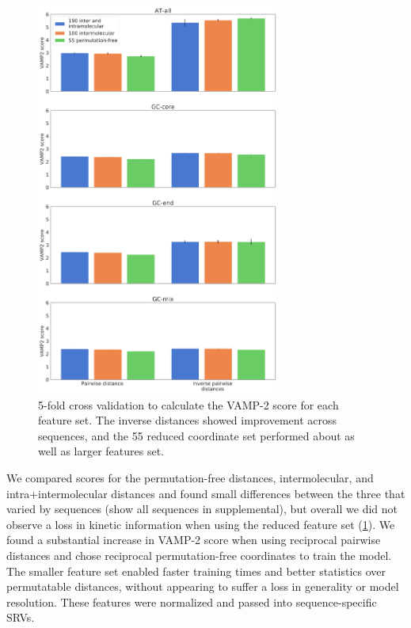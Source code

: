 \documentclass[journal=jpcbfk,manuscript=article]{achemso}
\begin{document}
\begin{figure}[ht!]
	\begin{center}
        \includegraphics[width=80mm,
        scale=0.5]{Figs/figs_0804/all_permute_vamps_grouped.png}
        \caption{5-fold cross validation to calculate the VAMP-2 score for each feature set. The inverse distances showed improvement across sequences, and the 55 reduced coordinate set performed about as well as larger features set.}
        \label{fig:allseq_features_vamp2}
	\end{center}
\end{figure}

We compared scores for the permutation-free distances, intermolecular, and intra+intermolecular distances and found small differences between the three that varied by sequences (show all sequences in supplemental), but overall we did not observe a loss in kinetic information when using the reduced feature set (\ref{fig:allseq_features_vamp2}). We found a substantial increase in VAMP-2 score when using reciprocal pairwise distances and chose reciprocal permutation-free coordinates to train the model. The smaller feature set enabled faster training times and better statistics over permutatable distances, without appearing to suffer a loss in generality or model resolution. These features were normalized and passed into sequence-specific SRVs. 
\end{document}
